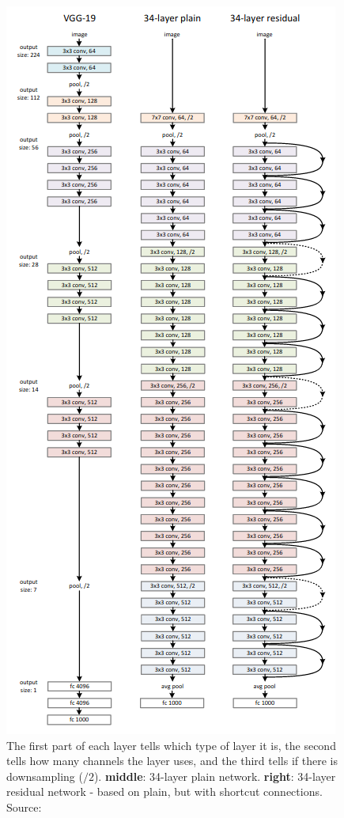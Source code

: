 \begin{figure}
    \centering
    \includegraphics[scale=0.69]{assets/residual-net.png}
    \caption{The first part of each layer tells which type of layer it is, the second tells how many channels the layer uses, and the third tells if there is downsampling ($/2$). \textbf{middle}: 34-layer plain network. \textbf{right}: 34-layer residual network - based on plain, but with shortcut connections. Source: \cite{resnet}}
    \label{fig:resnet}
\end{figure}


